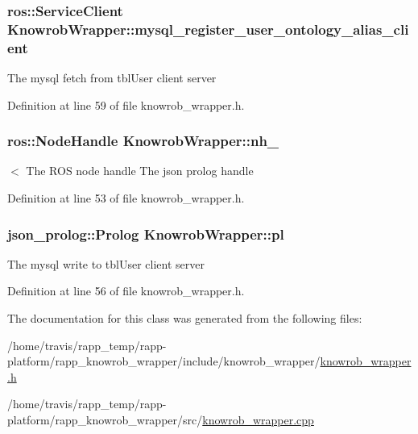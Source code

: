 \hypertarget{classKnowrobWrapper_a57089b048f31c7b67ccdaeff7a834bc3}{
\subsubsection[{mysql\-\_\-register\-\_\-user\-\_\-ontology\-\_\-alias\-\_\-client}]{\setlength{\rightskip}{0pt plus 5cm}ros\-::\-Service\-Client Knowrob\-Wrapper\-::mysql\-\_\-register\-\_\-user\-\_\-ontology\-\_\-alias\-\_\-client\hspace{0.3cm}{\ttfamily [private]}}}\label{classKnowrobWrapper_a57089b048f31c7b67ccdaeff7a834bc3}
The mysql fetch from tbl\-User client server 

Definition at line 59 of file knowrob\-\_\-wrapper.\-h.

\hypertarget{classKnowrobWrapper_a7e3aae6f36c23857030d977fa53e3baf}{
\subsubsection[{nh\-\_\-}]{\setlength{\rightskip}{0pt plus 5cm}ros\-::\-Node\-Handle Knowrob\-Wrapper\-::nh\-\_\-\hspace{0.3cm}{\ttfamily [private]}}}\label{classKnowrobWrapper_a7e3aae6f36c23857030d977fa53e3baf}
$<$ The R\-O\-S node handle The json prolog handle 

Definition at line 53 of file knowrob\-\_\-wrapper.\-h.

\hypertarget{classKnowrobWrapper_a85cb0352dccaebe49a4f382d39911400}{
\subsubsection[{pl}]{\setlength{\rightskip}{0pt plus 5cm}json\-\_\-prolog\-::\-Prolog Knowrob\-Wrapper\-::pl\hspace{0.3cm}{\ttfamily [private]}}}\label{classKnowrobWrapper_a85cb0352dccaebe49a4f382d39911400}
The mysql write to tbl\-User client server 

Definition at line 56 of file knowrob\-\_\-wrapper.\-h.



The documentation for this class was generated from the following files\-:\begin{DoxyCompactItemize}
\item 
/home/travis/rapp\-\_\-temp/rapp-\/platform/rapp\-\_\-knowrob\-\_\-wrapper/include/knowrob\-\_\-wrapper/\hyperlink{knowrob__wrapper_8h}{knowrob\-\_\-wrapper.\-h}\item 
/home/travis/rapp\-\_\-temp/rapp-\/platform/rapp\-\_\-knowrob\-\_\-wrapper/src/\hyperlink{knowrob__wrapper_8cpp}{knowrob\-\_\-wrapper.\-cpp}\end{DoxyCompactItemize}
